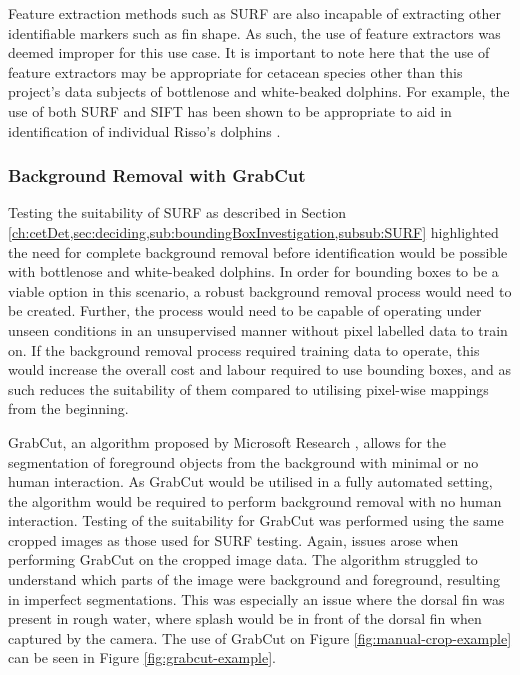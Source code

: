 Feature extraction methods such as SURF are also incapable of extracting other identifiable markers such as fin shape. As such, the use of feature extractors was deemed improper for this use case. It is important to note here that the use of feature extractors may be appropriate for cetacean species other than this project's data subjects of bottlenose and white-beaked dolphins. For example, the use of both SURF and SIFT has been shown to be appropriate to aid in identification of individual Risso's dolphins \cite{reno_sift-based_2019, maglietta_dolfin_2018}.

\subsubsection{Background Removal with GrabCut}\label{ch:cetDet,sec:deciding,sub:boundingBoxInvestigation,subsub:GrabCut}

Testing the suitability of SURF as described in Section \ref{ch:cetDet,sec:deciding,sub:boundingBoxInvestigation,subsub:SURF} highlighted the need for complete background removal before identification would be possible with bottlenose and white-beaked dolphins. In order for bounding boxes to be a viable option in this scenario, a robust background removal process would need to be created. Further, the process would need to be capable of operating under unseen conditions in an unsupervised manner without pixel labelled data to train on. If the background removal process required training data to operate, this would increase the overall cost and labour required to use bounding boxes, and as such reduces the suitability of them compared to utilising pixel-wise mappings from the beginning.

GrabCut, an algorithm proposed by Microsoft Research \cite{rother_grabcut_2004}, allows for the segmentation of foreground objects from the background with minimal or no human interaction. As GrabCut would be utilised in a fully automated setting, the algorithm would be required to perform background removal with no human interaction. Testing of the suitability for GrabCut was performed using the same cropped images as those used for SURF testing. Again, issues arose when performing GrabCut on the cropped image data. The algorithm struggled to understand which parts of the image were background and foreground, resulting in imperfect segmentations. This was especially an issue where the dorsal fin was present in rough water, where splash would be in front of the dorsal fin when captured by the camera. The use of GrabCut on Figure \ref{fig:manual-crop-example} can be seen in Figure \ref{fig:grabcut-example}.

